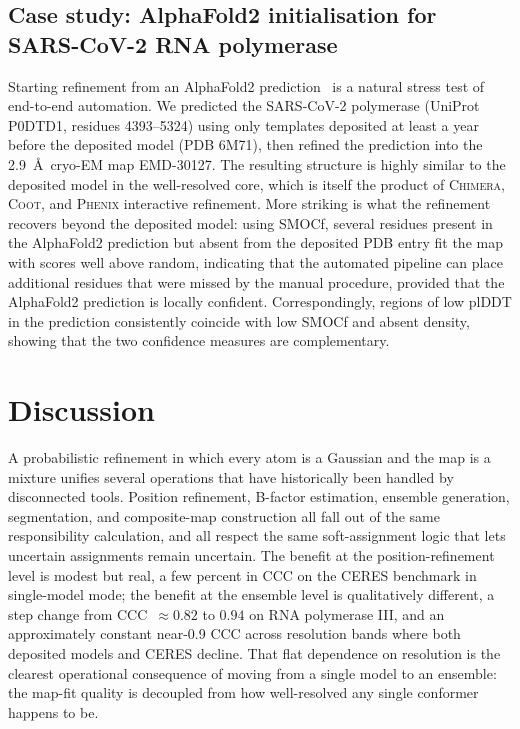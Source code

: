 \documentclass[11pt]{article}
\begin{document}
\subsection{Case study: AlphaFold2 initialisation for SARS-CoV-2 RNA polymerase}
Starting refinement from an AlphaFold2 prediction~\cite{jumper2021} is a natural stress test of end-to-end automation. We predicted the SARS-CoV-2 polymerase (UniProt P0DTD1, residues 4393--5324) using only templates deposited at least a year before the deposited model (PDB 6M71), then refined the prediction into the 2.9~\AA\ cryo-EM map EMD-30127. The resulting structure is highly similar to the deposited model in the well-resolved core, which is itself the product of \textsc{Chimera}, \textsc{Coot}, and \textsc{Phenix} interactive refinement. More striking is what the refinement recovers beyond the deposited model: using SMOCf, several residues present in the AlphaFold2 prediction but absent from the deposited PDB entry fit the map with scores well above random, indicating that the automated pipeline can place additional residues that were missed by the manual procedure, provided that the AlphaFold2 prediction is locally confident. Correspondingly, regions of low plDDT in the prediction consistently coincide with low SMOCf and absent density, showing that the two confidence measures are complementary.

\section{Discussion}

A probabilistic refinement in which every atom is a Gaussian and the map is a mixture unifies several operations that have historically been handled by disconnected tools. Position refinement, B-factor estimation, ensemble generation, segmentation, and composite-map construction all fall out of the same responsibility calculation, and all respect the same soft-assignment logic that lets uncertain assignments remain uncertain. The benefit at the position-refinement level is modest but real, a few percent in CCC on the CERES benchmark in single-model mode; the benefit at the ensemble level is qualitatively different, a step change from CCC~$\approx 0.82$ to $0.94$ on RNA polymerase III, and an approximately constant near-0.9 CCC across resolution bands where both deposited models and CERES decline. That flat dependence on resolution is the clearest operational consequence of moving from a single model to an ensemble: the map-fit quality is decoupled from how well-resolved any single conformer happens to be.
\end{document}

